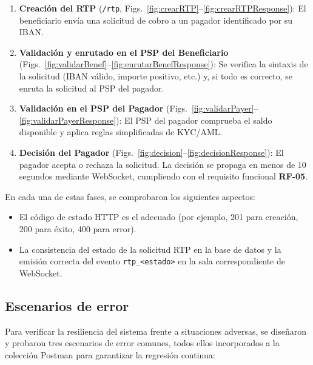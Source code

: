 \begin{enumerate}
  \item \textbf{Creación del RTP} (\texttt{/rtp}, Figs.~\ref{fig:crearRTP}–\ref{fig:crearRTPResponse}): El beneficiario envía una solicitud de cobro a un pagador identificado por su IBAN.
  
  \item \textbf{Validación y enrutado en el PSP del Beneficiario} (Figs.~\ref{fig:validarBenef}–\ref{fig:enrutarBenefResponse}): Se verifica la sintaxis de la solicitud (IBAN válido, importe positivo, etc.) y, si todo es correcto, se enruta la solicitud al PSP del pagador.
  
  \item \textbf{Validación en el PSP del Pagador} (Figs.~\ref{fig:validarPayer}–\ref{fig:validarPayerResponse}): El PSP del pagador comprueba el saldo disponible y aplica reglas simplificadas de KYC/AML.
  
  \item \textbf{Decisión del Pagador} (Figs.~\ref{fig:decision}–\ref{fig:decisionResponse}): El pagador acepta o rechaza la solicitud. La decisión se propaga en menos de 10 segundos mediante WebSocket, cumpliendo con el requisito funcional \textbf{RF-05}.
\end{enumerate}

En cada una de estas fases, se comprobaron los siguientes aspectos:

\begin{itemize}
  \item El código de estado HTTP es el adecuado (por ejemplo, 201 para creación, 200 para éxito, 400 para error).
  \item La consistencia del estado de la solicitud RTP en la base de datos y la emisión correcta del evento \texttt{rtp\_<estado>} en la sala correspondiente de WebSocket.
\end{itemize}

\subsection{Escenarios de error}

Para verificar la resiliencia del sistema frente a situaciones adversas, se diseñaron y probaron tres escenarios de error comunes, todos ellos incorporados a la colección Postman para garantizar la regresión continua:

